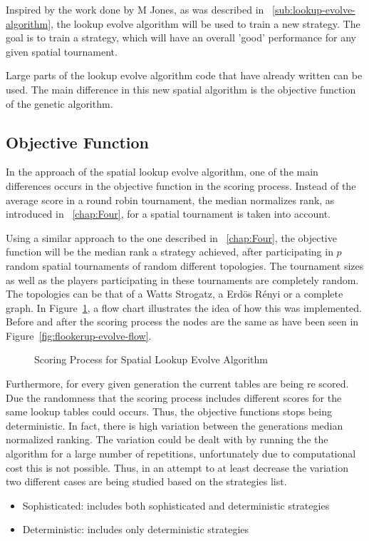 Inspired by the work done by M Jones, as was described in ~\autoref{sub:lookup-evolve-algorithm},
the lookup evolve algorithm will be used to train a new strategy. The goal is to
train a strategy, which will have an overall 'good' performance for any given
spatial tournament.

Large parts of the lookup evolve algorithm code that have already written
can be used. The main difference in this new spatial algorithm is the objective
function of the genetic algorithm.
\subsection{Objective Function}

In the approach of the spatial lookup evolve algorithm, one of the main differences
occurs in the objective function in the scoring process. Instead of the average
score in a round robin tournament, the median normalizes rank, as introduced
in ~\autoref{chap:Four}, for a spatial tournament is taken into account.

Using a similar approach to the one described in ~\autoref{chap:Four}, the objective
function will be the median rank a strategy achieved, after participating in \(p\)
random spatial tournaments of random different topologies. The tournament sizes
as well as the players participating in these tournaments are completely random.
The topologies can be that of a Watts Strogatz, a Erd\"{o}s
R\'{e}nyi or a complete graph. In Figure~\ref{fig:objective}, a flow chart
illustrates the idea of how this was implemented. Before and after the scoring
process the nodes are the same as have been seen in Figure~\ref{fig:flookerup-evolve-flow}.

\begin{figure}[!hbtp]
		
		\caption{Scoring Process for Spatial Lookup Evolve Algorithm}
  \label{fig:objective}
\end{figure}


Furthermore, for every given generation the current tables are being re scored.
Due the randomness that the scoring process includes different scores for the
same lookup tables could occurs. Thus, the objective functions stops being
deterministic. In fact, there is high variation between the generations median
normalized ranking. The variation could be dealt with by running the the algorithm
for a large number of repetitions, unfortunately due to computational cost this
is not possible. Thus, in an attempt to at least decrease the variation two different
cases are being studied based on the strategies list.
\begin{itemize}
  \item Sophisticated: includes both sophisticated and deterministic strategies
  \item Deterministic: includes only deterministic strategies
\end{itemize}



